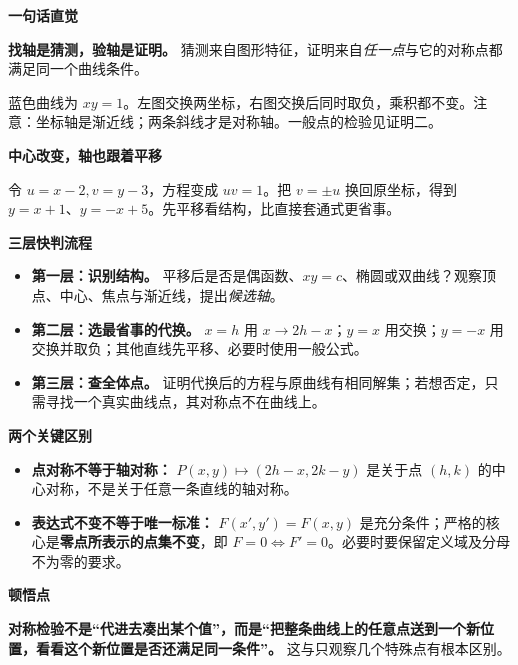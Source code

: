 \begin{explanationbox}
\textbf{\textcolor{CExplanation}{一句话直觉}}

\textbf{找轴是猜测，验轴是证明。} 猜测来自图形特征，证明来自\emph{任一点}与它的对称点都满足同一个曲线条件。

\medskip


蓝色曲线为 $xy=1$。左图交换两坐标，右图交换后同时取负，乘积都不变。注意：坐标轴是渐近线；两条斜线才是对称轴。一般点的检验见证明二。

\medskip
\textbf{\textcolor{CExplanation}{中心改变，轴也跟着平移}}



令 $u=x-2,v=y-3$，方程变成 $uv=1$。把 $v=\pm u$ 换回原坐标，得到 $y=x+1$、$y=-x+5$。先平移看结构，比直接套通式更省事。

\medskip
\textbf{\textcolor{CExplanation}{三层快判流程}}
\begin{itemize}[leftmargin=*, itemsep=0.45em]
  \item \textbf{第一层：识别结构。} 平移后是否是偶函数、$xy=c$、椭圆或双曲线？观察顶点、中心、焦点与渐近线，提出\emph{候选轴}。
  \item \textbf{第二层：选最省事的代换。} $x=h$ 用 $x\to2h-x$；$y=x$ 用交换；$y=-x$ 用交换并取负；其他直线先平移、必要时使用一般公式。
  \item \textbf{第三层：查全体点。} 证明代换后的方程与原曲线有相同解集；若想否定，只需寻找一个真实曲线点，其对称点不在曲线上。
\end{itemize}

\medskip
\textbf{\textcolor{CExplanation}{两个关键区别}}
\begin{itemize}[leftmargin=*, itemsep=0.45em]
  \item \textbf{点对称不等于轴对称：} $P(x,y)\mapsto(2h-x,2k-y)$ 是关于点 $(h,k)$ 的中心对称，不是关于任意一条直线的轴对称。
  \item \textbf{表达式不变不等于唯一标准：} $F(x',y')=F(x,y)$ 是充分条件；严格的核心是\textbf{零点所表示的点集不变}，即 $F=0\Longleftrightarrow F'=0$。必要时要保留定义域及分母不为零的要求。
\end{itemize}

\medskip
\textbf{\textcolor{CExplanation}{顿悟点}}

\textbf{对称检验不是“代进去凑出某个值”，而是“把整条曲线上的任意点送到一个新位置，看看这个新位置是否还满足同一条件”。} 这与只观察几个特殊点有根本区别。
\end{explanationbox}
